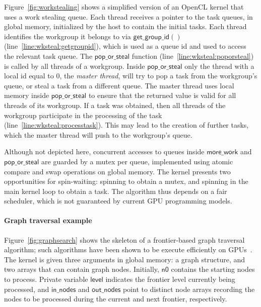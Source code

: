 \documentclass[numbers,nocopyrightspace,10pt]{sigplanconf}
\newcommand{\myfiglong}{Figure~}
\newcommand{\getgroupid}{\mathsf{get\_group\_id}}
\newcommand{\keyword}[1]{\mathsf{#1}}
\begin{document}
\myfiglong\ref{fig:workstealing} shows a simplified version of an OpenCL
kernel that uses a work stealing queue. Each thread receives a pointer to the task
queues, in global memory, initialized by the
host to contain the initial tasks. Each thread identifies
the workgroup it belongs to via $\getgroupid()$
(line~\ref{line:wksteal:getgroupid}), which is used as a queue id and used to access the relevant task queue. The
$\mathsf{pop\_or\_steal}$ function (line~\ref{line:wksteal:poporsteal})
is called by all threads of a workgroup.  Inside
$\mathsf{pop\_or\_steal}$ only the thread with a local id equal to $0$,
the \emph{master thread}, will try to pop a
task from the workgroup's queue, or steal a task from a different
queue. The master thread uses local memory inside
$\mathsf{pop\_or\_steal}$ to ensure that the returned value is valid for
all threads of its workgroup. If a task was obtained, then all threads
of the workgroup participate in the processing of the task (line~\ref{line:wksteal:processtask}).
This may lead to the creation of further tasks, which
the master thread will push to the workgroup's queue.

Although not depicted here, concurrent accesses to queues inside
$\mathsf{more\_work}$ and $\mathsf{pop\_or\_steal}$ are guarded by a
mutex per queue, implemented using atomic compare and swap operations
on global memory.  The kernel presents two opportunities
for spin-waiting: spinning to obtain a mutex, and spinning in the main
kernel loop to obtain a task.  The algorithm thus depends
on a fair scheduler, which is not guaranteed by current GPU programming models.

\paragraph{Graph traversal example} \myfiglong\ref{fig:graphsearch} shows the
skeleton of a frontier-based graph traversal algorithm; such algorithms have
been shown to be execute efficiently on GPUs~\cite{BNP12,DBLP:conf/oopsla/PaiP16}. 
The kernel is
given three arguments in global memory: a graph structure, and two
arrays that can contain graph nodes. Initially, $\keyword{n0}$ contains the
starting nodes to process. Private variable $\keyword{level}$ indicates the frontier level currently being
processed, and $\keyword{in\_nodes}$ and $\keyword{out\_nodes}$ point to
distinct node arrays recording the nodes to be processed during the current and next frontier, respectively.
\end{document}

